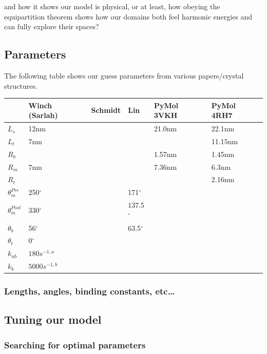 \documentclass[10pt]{article} %
\begin{document}
and how it shows our model is physical, or at least, how obeying the equipartition theorem shows
how our domains both feel harmonic energies and can fully explore their spaces?\\

\subsection{Parameters}
The following table shows our guess parameters from various papers/crystal structures.\\
                        
                        \begin{center}
  \begin{tabular}{| l | l | l | l | l | l |}
    \hline
    & Winch (Sarlah) & Schmidt & Lin & PyMol 3VKH & PyMol 4RH7\\\hline
    $L_s$ & 12nm & & & 21.0nm & 22.1nm\\ \hline
    $L_t$ &  7nm & & & & 11.15nm\\ \hline
    $R_b$ &  & & & 1.57nm & 1.45nm\\ \hline
    $R_m$ &  7nm & & & 7.36nm & 6.3nm\\ \hline
    $R_t$ &  & & & & 2.16nm \\ \hline
    $\theta_{m}^{Pre}$ & 250$^{\circ}$ & & 171$^{\circ}$ & &\\ \hline
    $\theta_{m}^{Post}$ & 330$^{\circ}$ & & 137.5$^{\circ}$ & &\\ \hline
    $\theta_{b}$ & 56$^{\circ}$ & & 63.5$^{\circ}$ & &\\ \hline
    $\theta_{t}$ & 0$^{\circ}$ & & & &\\ \hline
    $k_{ub}$ & $180 s^{-1,a}$ & & & &\\ \hline
    $k_b$ & $5000 s^{-1,b}$ & & & &\\ \hline
  \end{tabular}
\end{center}
		\subsubsection{Lengths, angles, binding constants, etc…}
	\subsection{Tuning our model}
	\subsubsection{Searching for optimal parameters}
\end{document}
